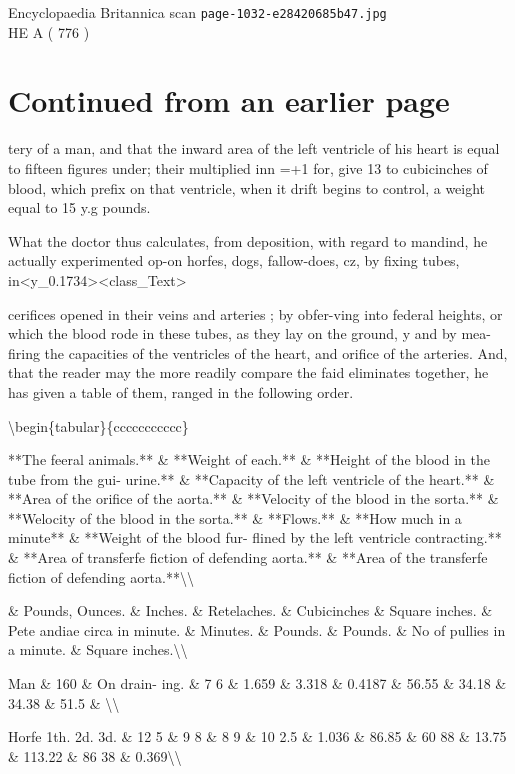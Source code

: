 \documentclass{article}
\begin{document}
\begin{center}
{\Large Encyclopaedia Britannica scan \texttt{page-1032-e28420685b47.jpg}}\\[0.5em]
HE A ( 776 )
\end{center}
\section*{Continued from an earlier page}
tery of a man, and that the inward area of the left ventricle of his heart is equal to fifteen figures under; their multiplied inn =+1 for, give 13 to cubicinches of blood, which prefix on that ventricle, when it drift begins to control, a weight equal to 15 y.g pounds.

What the doctor thus calculates, from deposition, with regard to mandind, he actually experimented op-on horfes, dogs, fallow-does, cz, by fixing tubes, in<y\_0.1734><class\_Text>

cerifices opened in their veins and arteries ; by obfer-ving into federal heights, or which the blood rode in these tubes, as they lay on the ground, y and by mea- firing the capacities of the ventricles of the heart, and orifice of the arteries. And, that the reader may the more readily compare the faid eliminates together, he has given a table of them, ranged in the following order.

\textbackslash{}begin\{tabular\}\{ccccccccccc\}

**The feeral animals.** \& **Weight of each.** \& **Height of the blood in the tube from the gui- urine.** \& **Capacity of the left ventricle of the heart.** \& **Area of the orifice of the aorta.** \& **Velocity of the blood in the sorta.** \& **Welocity of the blood in the sorta.** \& **Flows.** \& **How much in a minute** \& **Weight of the blood fur- flined by the left ventricle contracting.** \& **Area of transferfe fiction of defending aorta.** \& **Area of the transferfe fiction of defending aorta.**\textbackslash{}\textbackslash{}

\& Pounds, Ounces. \& Inches. \& Retelaches. \& Cubicinches \& Square inches. \& Pete andiae circa in minute. \& Minutes. \& Pounds. \& Pounds. \& No of pullies in a minute. \& Square inches.\textbackslash{}\textbackslash{}

Man \& 160 \& On drain- ing. \& 7 6 \& 1.659 \& 3.318 \& 0.4187 \& 56.55 \& 34.18 \& 34.38 \& 51.5 \& \textbackslash{}\textbackslash{}

Horfe 1th. 2d. 3d. \& 12 5 \& 9 8 \& 8 9 \& 10 2.5 \& 1.036 \& 86.85 \& 60 88 \& 13.75 \& 113.22 \& 86 38 \& 0.369\textbackslash{}\textbackslash{}
\end{document}
